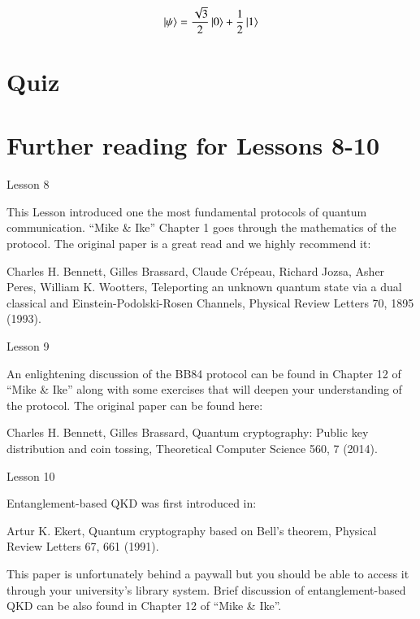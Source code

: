 \newpage
\begin{exercises}
\begin{equation*}
\ket{\psi} = \frac{\sqrt{3}}{2}\ket{0} + \frac{1}{2}\ket{1}
\end{equation*}


\end{exercises}

\newpage
\section*{Quiz}


\section*{Further reading for Lessons 8-10}

Lesson 8

This Lesson introduced one the most fundamental protocols of quantum communication. “Mike \& Ike” Chapter 1 goes through the mathematics of the protocol. The original paper is a great read and we highly recommend it:

Charles H. Bennett, Gilles Brassard, Claude Crépeau, Richard Jozsa, Asher Peres, William K. Wootters, Teleporting an unknown quantum state via a dual classical and Einstein-Podolski-Rosen Channels, Physical Review Letters 70, 1895 (1993).

Lesson 9

An enlightening discussion of the BB84 protocol can be found in Chapter 12 of “Mike \& Ike” along with some exercises that will deepen your understanding of the protocol.
The original paper can be found here:

Charles H. Bennett, Gilles Brassard, Quantum cryptography: Public key distribution and coin tossing, Theoretical Computer Science 560, 7 (2014).

Lesson 10

Entanglement-based QKD was first introduced in:

Artur K. Ekert, Quantum cryptography based on Bell’s theorem, Physical Review Letters 67, 661 (1991).

This paper is unfortunately behind a paywall but you should be able to access it through your university’s library system.
Brief discussion of entanglement-based QKD can be also found in Chapter 12 of “Mike \& Ike”.
